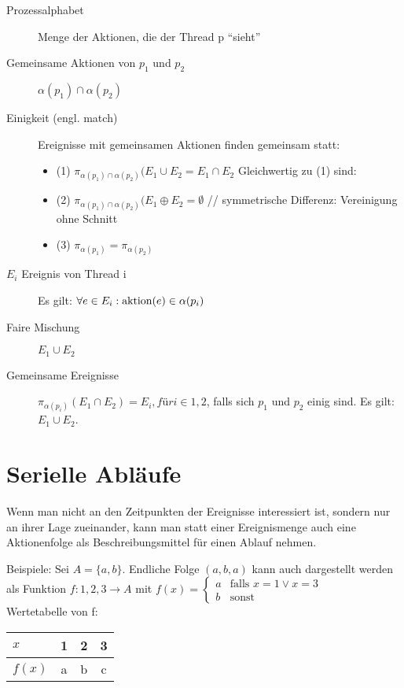 \begin{description}
	\item[Prozessalphabet] Menge der Aktionen, die der Thread p "`sieht"'
	\item[Gemeinsame Aktionen von $ p_1 $ und $ p_2 $] $ \alpha(p_1) \cap \alpha(p_2) $
	\item[Einigkeit (engl. match)] Ereignisse mit gemeinsamen Aktionen finden gemeinsam statt:
	\begin{itemize} %
		\item (1) $ \pi_{\alpha(p_1) \cap \alpha(p_2)}(E_1 \cup E_2 = E_1 \cap E_2 $ Gleichwertig zu (1) sind:\\
		\item (2) $ \pi_{\alpha(p_1) \cap \alpha(p_2)}(E_1 \oplus E_2 = \emptyset $ // symmetrische Differenz: Vereinigung ohne Schnitt
		\item (3) $ \pi_{\alpha(p_1)} = \pi_{\alpha(p_2)} $
	\end{itemize}
	\item[$ E_i $ Ereignis von Thread i] Es gilt: $ \forall e \in E_i: \operatorname{aktion}(e) \in \alpha(p_i) $
	\item[Faire Mischung] $ E_1 \cup E_2 $
	\item[Gemeinsame Ereignisse] $ \pi_{\alpha(p_i)}(E_1 \cap E_2) = E_i, für i \in {1, 2} $, falls sich $ p_1 $ und $ p_2 $ einig sind. Es gilt: $ E_1 \cup E_2 $.
\end{description}


\section{Serielle Abläufe}
Wenn man nicht an den Zeitpunkten der Ereignisse interessiert ist, sondern nur an ihrer Lage zueinander, kann man statt einer Ereignismenge auch eine Aktionenfolge als Beschreibungsmittel für einen Ablauf nehmen.

Beispiele: Sei $ A = \{a, b\} $. Endliche Folge $ (a, b, a) $ kann auch dargestellt werden als Funktion $ f: {1, 2, 3} \rightarrow A $ mit $ f(x) = \begin{cases} a & \text{falls } x = 1 \vee x = 3\\ b & \text{sonst}\end{cases} $\\
Wertetabelle von f:
\begin{center}
	\begin{tabular}{l|c c c}
		$ x $ & 1 & 2 & 3\\ \hline
		$ f(x) $ & a & b & c
	\end{tabular}
\end{center}

